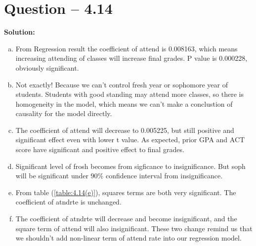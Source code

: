 \documentclass[11pt]{article} %
\begin{document}
\section{Question -- 4.14}
\textbf{Solution:}
\begin{enumerate}[a)]
    \item From Regression result the coefficient of attend is 0.008163, which means increasing attending of classes will increase final grades. P value is 0.000228, obviously significant.
    \item Not exactly! Because we can't control fresh year or sophomore year of students. Students with good standing may attend more classes, so there is homogeneity in the model, which means we can't make a conclustion of causality for the model directly.
    \item The coefficient of attend will decrease to  0.005225, but still positive and significant effect even with lower t value. As expected, prior GPA and ACT score have significant and positive effect to final grades.
    \item Significant level of frosh becomes from sigficance to insignificance. But soph will be significant under $90\%$ confidence interval from insignificance.
    \item From table (\ref{table:4.14(e)}), squares terms are both very significant. The coefficient of atndrte is unchanged.
    \item The coefficient of atndrte will decrease and become insignificant, and the square term of attend will also insignificant. These two change remind us that we shouldn't add non-linear term of attend rate into our regression model.
\end{enumerate}
\end{document}
